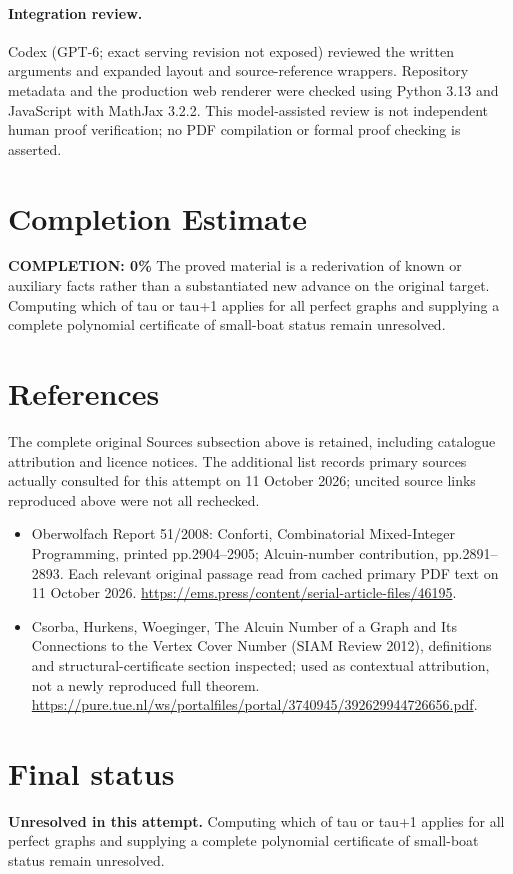 \documentclass[11pt]{article}
\begin{document}
\paragraph{Integration review.} Codex (GPT-6; exact serving revision not exposed) reviewed the written arguments and expanded layout and source-reference wrappers. Repository metadata and the production web renderer were checked using Python 3.13 and JavaScript with MathJax 3.2.2. This model-assisted review is not independent human proof verification; no PDF compilation or formal proof checking is asserted.

\section{Completion Estimate}
\noindent\textbf{COMPLETION: 0\%}
The proved material is a rederivation of known or auxiliary facts rather than a substantiated new advance on the original target. Computing which of tau or tau+1 applies for all perfect graphs and supplying a complete polynomial certificate of small-boat status remain unresolved.
\section{References}
The complete original Sources subsection above is retained, including catalogue attribution and licence notices. The additional list records primary sources actually consulted for this attempt on 11 October 2026; uncited source links reproduced above were not all rechecked.
\begin{itemize}
\item Oberwolfach Report 51/2008: Conforti, Combinatorial Mixed-Integer Programming, printed pp.2904--2905; Alcuin-number contribution, pp.2891--2893. Each relevant original passage read from cached primary PDF text on 11 October 2026. \url{https://ems.press/content/serial-article-files/46195}.
\item Csorba, Hurkens, Woeginger, The Alcuin Number of a Graph and Its Connections to the Vertex Cover Number (SIAM Review 2012), definitions and structural-certificate section inspected; used as contextual attribution, not a newly reproduced full theorem. \url{https://pure.tue.nl/ws/portalfiles/portal/3740945/392629944726656.pdf}.
\end{itemize}
\section{Final status}
\textbf{Unresolved in this attempt.} Computing which of tau or tau+1 applies for all perfect graphs and supplying a complete polynomial certificate of small-boat status remain unresolved.
\end{document}
